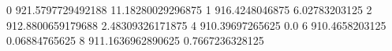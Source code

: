 0 921.5797729492188 11.18280029296875
1 916.4248046875 6.02783203125
2 912.8800659179688 2.48309326171875
4 910.39697265625 0.0
6 910.4658203125 0.06884765625
8 911.1636962890625 0.7667236328125
